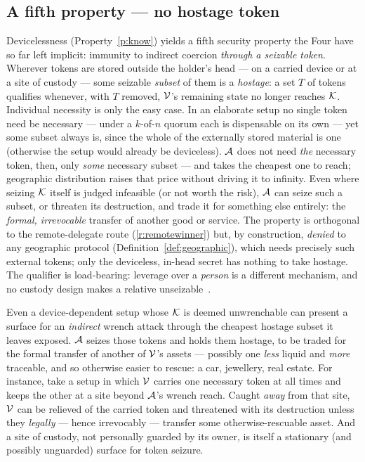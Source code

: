 \subsection{A fifth property --- no hostage token}
\label{sub:hostage}

Devicelessness (Property~\ref{p:know}) yields a fifth security property the Four have
so far left implicit: immunity to indirect coercion \emph{through a seizable
token}. Wherever tokens are stored outside the holder's head --- on a carried device
or at a site of custody --- some seizable \emph{subset} of them is a \emph{hostage}:
a set $T$ of tokens qualifies whenever, with $T$ removed, $\mathcal{V}$'s remaining state
no longer reaches $\mathcal{K}$. Individual necessity is only the easy case. In an elaborate
setup no single token need be necessary --- under a $k$-of-$n$ quorum each is
dispensable on its own --- yet some subset always is, since the whole of the
externally stored material is one (otherwise the setup would already be deviceless).
$\mathcal{A}$ does not need \emph{the} necessary token, then, only \emph{some} necessary
subset --- and takes the cheapest one to reach; geographic distribution raises that
price without driving it to infinity. Even where seizing $\mathcal{K}$ itself
is judged infeasible (or not worth the risk), $\mathcal{A}$ can seize such a subset, or
threaten its destruction, and trade it for something else entirely: the \emph{formal,
irrevocable} transfer of another good or service. The property is orthogonal to the
remote-delegate route (\ref{r:remotewinner}) but, by construction, \emph{denied} to
any geographic protocol (Definition~\ref{def:geographic}), which needs precisely such
external tokens; only the deviceless, in-head secret has nothing to take hostage.
The qualifier is load-bearing: leverage over a \emph{person} is a different
mechanism, and no custody design makes a relative
unseizable~\cite[\S7]{denial-spiral}.

\begin{remark}\label{rem:hostage}
Even a device-dependent setup whose $\mathcal{K}$ is deemed unwrenchable can present a surface
for an \emph{indirect} wrench attack through the cheapest hostage subset it leaves
exposed. $\mathcal{A}$ seizes those tokens and holds them hostage, to be traded for the
formal transfer of another of $\mathcal{V}$'s assets --- possibly one \emph{less} liquid
and \emph{more} traceable, and so otherwise easier to rescue: a car, jewellery, real
estate. For instance, take a setup in which $\mathcal{V}$ carries one necessary token at
all times and keeps the other at a site beyond $\mathcal{A}$'s wrench reach. Caught
\emph{away} from that site, $\mathcal{V}$ can be relieved of the carried token and
threatened with its destruction unless they \emph{legally} --- hence irrevocably ---
transfer some otherwise-rescuable asset. And a site of custody, not personally
guarded by its owner, is itself a stationary (and possibly unguarded) surface for
token seizure.
\end{remark}

